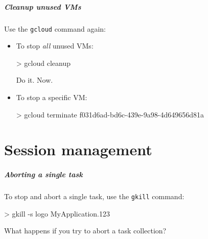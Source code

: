 \documentclass[english,serif,mathserif,usenames,dvipsnames]{beamer}
\begin{document}





\begin{frame}
  \frametitle{Cleanup unused VMs}

  Use the \texttt{gcloud} command again:

  \begin{itemize}
  \item To stop \emph{all} unused VMs:
\begin{semiverbatim}
    > gcloud cleanup
\end{semiverbatim}

    \begin{exercise}
      Do it. Now.
    \end{exercise}

  \item To stop a specific VM:
\begin{semiverbatim}
    > gcloud terminate f031d6ad-bd6c-439e-9a98-4d649656d81a
\end{semiverbatim}
  \end{itemize}
\end{frame}


\part{Session management}

\begin{frame}
  \frametitle{Aborting a single task}

  To stop and abort a single task, use the \texttt{gkill} command:
\begin{semiverbatim}
    > gkill -s logo MyApplication.123
\end{semiverbatim}

  \pause
  \begin{exercise*}
    What happens if you try to abort a task collection?
  \end{exercise*}
\end{frame}
\end{document}
